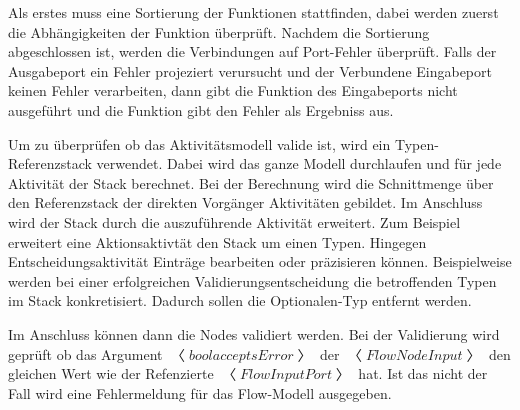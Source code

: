\documentclass{article}
\begin{document}
    Als erstes muss eine Sortierung der Funktionen stattfinden, dabei werden zuerst die Abhängigkeiten der Funktion überprüft.
    Nachdem die Sortierung abgeschlossen ist, werden die Verbindungen auf Port-Fehler überprüft. Falls der Ausgabeport ein Fehler projeziert verursucht und der Verbundene Eingabeport keinen Fehler verarbeiten, dann gibt die Funktion des Eingabeports nicht ausgeführt und die Funktion gibt den Fehler als Ergebniss aus.

    Um zu überprüfen ob das Aktivitätsmodell valide ist, wird ein Typen-Referenzstack verwendet.
    Dabei wird das ganze Modell durchlaufen und für jede Aktivität der Stack berechnet.
    Bei der Berechnung wird die Schnittmenge über den Referenzstack der direkten Vorgänger Aktivitäten gebildet.
    Im Anschluss wird der Stack durch die auszuführende Aktivität erweitert.
    Zum Beispiel erweitert eine Aktionsaktivtät den Stack um einen Typen. 
    Hingegen Entscheidungsaktivität Einträge bearbeiten oder präzisieren können. Beispielweise werden bei einer erfolgreichen Validierungsentscheidung die betroffenden Typen im Stack konkretisiert. Dadurch sollen die Optionalen-Typ entfernt werden.
   
    Im Anschluss können dann die Nodes validiert werden. 
    Bei der Validierung wird geprüft ob das Argument $〈bool acceptsError〉$ der $〈FlowNodeInput〉$ den gleichen Wert wie der Refenzierte $〈FlowInputPort〉$ hat. Ist das nicht der Fall wird eine Fehlermeldung für das Flow-Modell ausgegeben.
\end{document}
